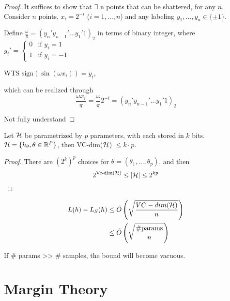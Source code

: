 \begin{proof}
    It suffices to show that \(\exists\) n points that can be shattered, for any \(n\). \\ 
    Consider \(n\) points, \(x_i = 2^{-i}\) (\(i = 1, \ldots, n\)) and any labeling 
    \(y_1, \ldots, y_n \in \{\pm 1\}\). 

    Define \( \frac{\omega}{\pi} = \left( y_n' y_{n-1}' \ldots y_1' 1 \right)_2\) in terms of 
    binary integer, where \(y_i' = \begin{cases}
        0 &\text{if } y_i = 1 \\ 
        1 &\text{if } y_i = -1 
    \end{cases}\) 

    WTS \(\text{sign}\left(\sin (\omega x_i)\right) = y_i\), 

    which can be realized through 
    \[
        \frac{\omega x_i}{\pi} = \frac{\omega}{\pi} 2^{-i} = \left(y_n' y_{n-1}' \ldots y_1' 1 \right)_2 
    \]

    \color{red} Not fully understand 
\end{proof}


\begin{theorem}
    Let \(\mathcal{H}\) be parametrized by \(p\) parameters, with each stored in \(k\) bits. 
    \(\mathcal{H} = \{h_\theta, \theta \in \mathbb{R}^P\}\), then VC-dim(\(\mathcal{H}\)) \(\leq k \cdot p\). 
\end{theorem}

\begin{proof}
    There are \((2^k)^p\) choices for \(\theta = (\theta_1, \ldots, \theta_p)\), and then 
    \[
        2^{\text{Vc-dim}(\mathcal{H})} \leq \lvert \mathcal{H} \rvert \leq 2^{kp}
    \]
\end{proof}

\begin{remark}
    \begin{align*}
        L(h) - L_S(h) &\leq \tilde{O} \left(\sqrt{\frac{VC-dim(\mathcal{H})}{n}}\right) \\ 
                      &\leq \tilde{O} \left(\sqrt{\frac{\#\text{params}}{n}}\right)
    \end{align*}

    If \# params >> \# samples, the bound will become vacuous. 
\end{remark}


\chapter{Margin Theory}

